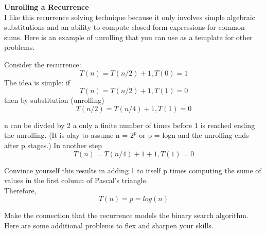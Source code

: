 \documentclass{article}
\begin{document}
\noindent \textbf{Unrolling a Recurrence}\\

\noindent I like this recurrence solving technique because it only involves
simple algebraic substitutions and an ability to compute closed form expressions
for common sums. Here is an example of unrolling that you can use as a template
for other problems.

Consider the recurrence:
\[ T(n) = T(n/2) + 1, T(0) = 1 \]
The idea is simple: if
\[ T(n) = T(n/2) + 1, T(1) = 0 \]
then by substitution (unrolling)
\[ T(n/2) = T(n/4) + 1, T(1) = 0 \]

\noindent n can be divded by 2 a only a finite number of times before 1 is
reached ending the unrolling. (It is olay to assume n = $2^p$ or p = logn and the
unrolling ends after p stages.) In another step
\[ T(n) = T(n/4) + 1 + 1, T(1) = 0 \]

\noindent Convince yourself this results in adding 1 to itself p times computing
the sume of values in the first column of Pascal's triangle.\\
Therefore,
\[ T(n) = p = log(n) \]

\noindent Make the connection that the recurrence models the binary search algorithm.\\
\noindent Here are some additional problems to flex and sharpen your skills.
\end{document}
